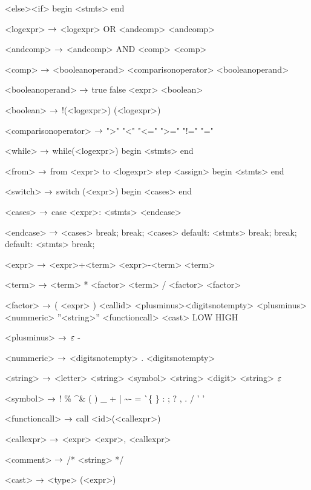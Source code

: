 \begin{grammar}
<else><if>
	\alt 
	begin
		<stmts>
	end
	 
<logexpr> $\rightarrow$ <logexpr> OR <andcomp>
		\alt <andcomp>

<andcomp> $\rightarrow$ <andcomp> AND <comp>

<comp> $\rightarrow$ <booleanoperand> <comparisonoperator> <booleanoperand>

<booleanoperand> $\rightarrow$ true
		\alt false
		\alt <boolean>

<boolean> $\rightarrow$ !(<logexpr>)
		\alt (<logexpr>)

<comparisonoperator> $\rightarrow$ ">"
				\alt "<"
				\alt "<="
				\alt ">="
				\alt "!="
				\alt "="

<while> $\rightarrow$ while(<logexpr>)
		begin
			<stmts>
		end
		
<from> $\rightarrow$ from <expr> to <logexpr> step <assign>
	begin
		<stmts>
	end

<switch> $\rightarrow$ switch (<expr>)
		begin
			<cases>
		end

<cases> $\rightarrow$ case <expr>:
			<stmts>
		<endcase>
		
<endcase> $\rightarrow$ <cases>
		\alt break;
		\alt break;
		<cases>
		\alt default:
			<stmts>
			break;
		\alt break;
		default:
			<stmts>
			break;

<expr> $\rightarrow$ <expr>+<term>
	\alt<expr>-<term>
	\alt<term>

<term> $\rightarrow$ <term> * <factor>
	\alt <term> / <factor>
	\alt <factor>

<factor> $\rightarrow$ ( <expr> )
	\alt <callid>
	\alt <plusminus><digitsnotempty>
	\alt <plusminus><nummeric>
	\alt ''<string>''
	\alt <functioncall> 
	\alt <cast>
	\alt LOW
	\alt HIGH

<plusminus> $\rightarrow$ $\varepsilon$
	\alt -

<nummeric> $\rightarrow$ <digitsnotempty> . <digitsnotempty>

<string> $\rightarrow$ <letter> <string>
\alt <symbol> <string>
\alt <digit> <string>
\alt $\varepsilon$

<symbol> $\rightarrow$ !
\alt \%
\alt \^
\alt \&
\alt *
\alt (
\alt )
\alt \_
\alt +
\alt |
\alt \~
\alt -
\alt =
\alt \`
\alt \{
\alt \}
\alt [
\alt ]
\alt :
\alt ;
\alt ?
\alt ,
\alt .
\alt /
\alt ' '

<functioncall> $\rightarrow$ call <id>(<callexpr>)

<callexpr> $\rightarrow$ <expr>
\alt <expr>, <callexpr>

<comment> $\rightarrow$ /* <string> */

<cast> $\rightarrow$ <type> (<expr>)

\end{grammar}